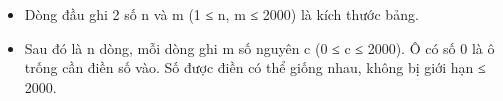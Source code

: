 \begin{itemize}
	\item Dòng đầu ghi 2 số n và m (1 ≤ n, m ≤ 2000) là kích thước bảng.
	\item Sau đó là n dòng, mỗi dòng ghi m số nguyên c (0 ≤ c ≤ 2000). Ô có số 0 là ô trống cần điền số vào. Số được điền có thể giống nhau, không bị giới hạn ≤ 2000.
\end{itemize}